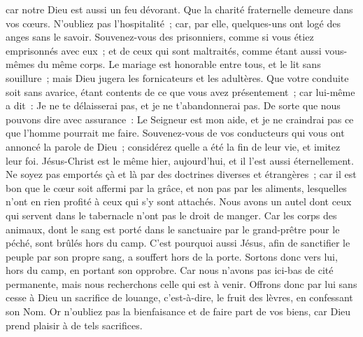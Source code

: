 \begin{multicols}{2}
car notre Dieu est aussi un feu dévorant.
\VerseOne{}Que la charité fraternelle demeure dans vos cœurs.
N'oubliez pas l'hospitalité~; car, par elle, quelques-uns ont logé des anges sans le savoir.
Souvenez-vous des prisonniers, comme si vous étiez emprisonnés avec eux~; et de ceux qui sont maltraités, comme étant aussi vous-mêmes du même corps.
Le mariage est honorable entre tous, et le lit sans souillure~; mais Dieu jugera les fornicateurs et les adultères.
Que votre conduite soit sans avarice, étant contents de ce que vous avez présentement~; car lui-même a dit~: Je ne te délaisserai pas, et je ne t'abandonnerai pas.
De sorte que nous pouvons dire avec assurance~: Le Seigneur est mon aide, et je ne craindrai pas ce que l'homme pourrait me faire.
Souvenez-vous de vos conducteurs qui vous ont annoncé la parole de Dieu~; considérez quelle a été la fin de leur vie, et imitez leur foi.
Jésus-Christ est le même hier, aujourd'hui, et il l'est aussi éternellement.
Ne soyez pas emportés çà et là par des doctrines diverses et étrangères~; car il est bon que le cœur soit affermi par la grâce, et non pas par les aliments, lesquelles n'ont en rien profité à ceux qui s'y sont attachés.
Nous avons un autel dont ceux qui servent dans le tabernacle n'ont pas le droit de manger.
Car les corps des animaux, dont le sang est porté dans le sanctuaire par le grand-prêtre pour le péché, sont brûlés hors du camp.
C'est pourquoi aussi Jésus, afin de sanctifier le peuple par son propre sang, a souffert hors de la porte.
Sortons donc vers lui, hors du camp, en portant son opprobre.
Car nous n'avons pas ici-bas de cité permanente, mais nous recherchons celle qui est à venir.
Offrons donc par lui sans cesse à Dieu un sacrifice de louange, c'est-à-dire, le fruit des lèvres, en confessant son Nom.
Or n'oubliez pas la bienfaisance et de faire part de vos biens, car Dieu prend plaisir à de tels sacrifices.

\end{multicols}

